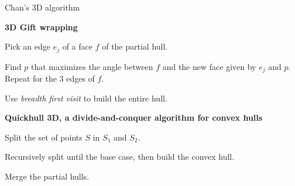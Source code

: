 \documentclass[14pt, handout]{beamer}
\begin{document}
\begin{frame}{Chan's 3D algorithm}
	\begin{center}
		\begin{fullpageitemize}
			\item<1->[\rtarrow] \textbf{3D Gift wrapping}
			\fontsize{12}{14}\notosansfont
			\begin{sublist}
				\item<2-> Pick an edge $e_j$ of a face $f$ of the partial hull. 
				\item<3-> Find $p$ that maximizes the angle between $f$ and the new face given by $e_j$ and $p$. Repeat for the 3 edges of $f$.
				\item<4-> Use \textit{breadth first visit} to build the entire hull.
			\end{sublist}
			
			\item<5->[\rtarrow] \textbf{Quickhull 3D, a divide-and-conquer algorithm for convex hulls}	
			\fontsize{12}{14}\notosansfont
			\begin{sublist}
				\item<6-> Split the set of points $S$ in $S_1$ and $S_2$.
				\item<7-> Recursively split until the base case, then build the convex hull.
				\item<8-> Merge the partial hulls.
			\end{sublist}
		\end{fullpageitemize}
	\end{center}
\end{frame}
\end{document}
